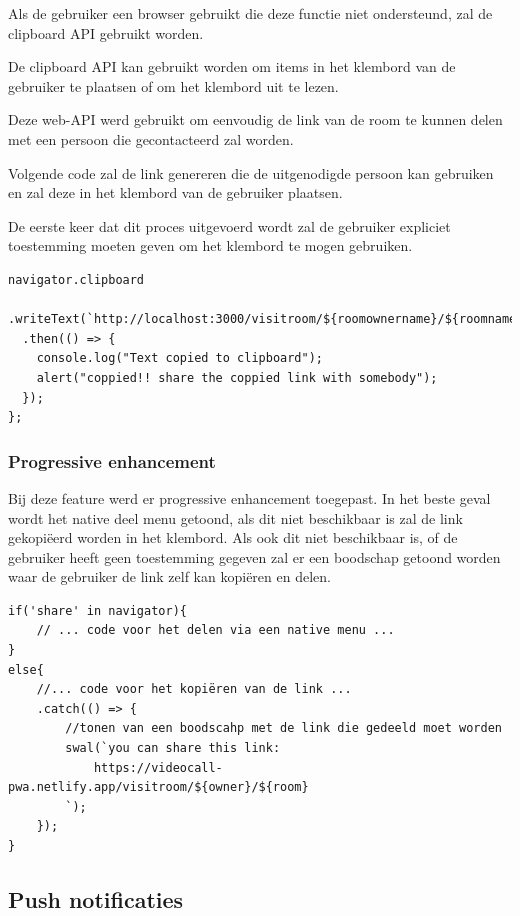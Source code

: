 		Als de gebruiker een browser gebruikt die deze functie niet ondersteund, zal de clipboard API gebruikt worden.
	
		De clipboard API kan gebruikt worden om items in het klembord van de gebruiker te plaatsen of om het klembord uit te lezen.
		
		Deze web-API werd gebruikt om eenvoudig de link van de room te kunnen delen met een persoon die gecontacteerd zal worden.
		
		Volgende code zal de link genereren die de uitgenodigde persoon kan gebruiken en zal deze in het klembord van de gebruiker plaatsen.
		
		De eerste keer dat dit proces uitgevoerd wordt zal de gebruiker expliciet toestemming moeten geven om het klembord te mogen gebruiken.

\begin{lstlisting}
navigator.clipboard
  .writeText(`http://localhost:3000/visitroom/${roomownername}/${roomname}`)
  .then(() => {
    console.log("Text copied to clipboard");
    alert("coppied!! share the coppied link with somebody");
  });
};
\end{lstlisting}

		\subsubsection{Progressive enhancement}

			Bij deze feature werd er progressive enhancement toegepast. 
			In het beste geval wordt het native deel menu getoond, als dit niet beschikbaar is zal de link gekopiëerd worden in het klembord.
			Als ook dit niet beschikbaar is, of de gebruiker heeft geen toestemming gegeven zal er een boodschap getoond worden waar de gebruiker de link zelf kan kopiëren en delen.
		
\begin{lstlisting}
if('share' in navigator){
	// ... code voor het delen via een native menu ...
}
else{
	//... code voor het kopiëren van de link ...
	.catch(() => {
		//tonen van een boodscahp met de link die gedeeld moet worden
		swal(`you can share this link:
			https://videocall-pwa.netlify.app/visitroom/${owner}/${room}
		`);
	});
}
\end{lstlisting}


	\subsection{Push notificaties}
	
